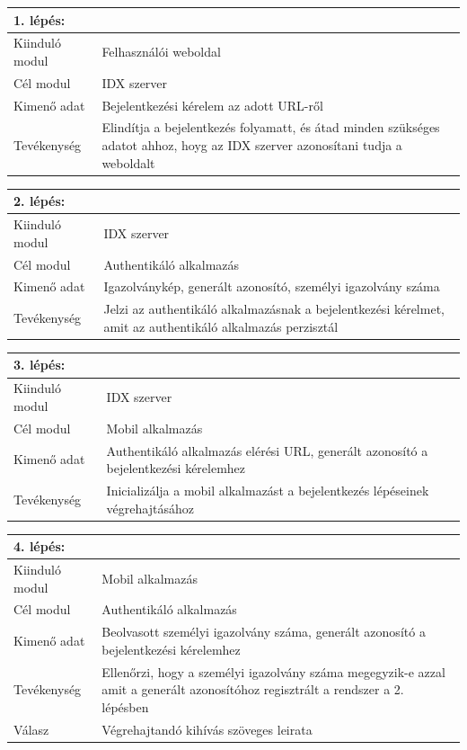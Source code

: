\begin{tabular}{|p{3cm}|p{10cm} |}
   	\hline
	\textbf{1. lépés:} & \textbf{}\\ \hline
	Kiinduló modul & Felhasználói weboldal \\ \hline
	Cél modul & IDX szerver \\ \hline
	Kimenő adat & Bejelentkezési kérelem az adott URL-ről \\ \hline
	Tevékenység & Elindítja a bejelentkezés folyamatt, és átad minden szükséges adatot ahhoz, hoyg az IDX szerver azonosítani tudja a weboldalt \\ \hline
\end{tabular}


\begin{tabular}{|p{3cm}|p{10cm} |}
   	\hline
	\textbf{2. lépés:} & \textbf{}\\ \hline
	Kiinduló modul & IDX szerver \\ \hline
	Cél modul & Authentikáló alkalmazás \\ \hline
	Kimenő adat & Igazolványkép, generált azonosító, személyi igazolvány száma \\ \hline
	Tevékenység & Jelzi az authentikáló alkalmazásnak a bejelentkezési kérelmet, amit az authentikáló alkalmazás perzisztál\\ \hline
\end{tabular}


\begin{tabular}{|p{3cm}|p{10cm} |}
   	\hline
	\textbf{3. lépés:} & \textbf{}\\ \hline
	Kiinduló modul & IDX szerver \\ \hline
	Cél modul & Mobil alkalmazás \\ \hline
	Kimenő adat & Authentikáló alkalmazás elérési URL, generált azonosító a bejelentkezési kérelemhez \\ \hline
	Tevékenység & Inicializálja a mobil alkalmazást a bejelentkezés lépéseinek végrehajtásához\\ \hline
\end{tabular}

\begin{tabular}{|p{3cm}|p{10cm} |}
   	\hline
	\textbf{4. lépés:} & \textbf{}\\ \hline
	Kiinduló modul & Mobil alkalmazás \\ \hline
	Cél modul & Authentikáló alkalmazás \\ \hline
	Kimenő adat & Beolvasott személyi igazolvány száma, generált azonosító a bejelentkezési kérelemhez \\ \hline
	Tevékenység & Ellenőrzi, hogy a személyi igazolvány száma megegyzik-e azzal amit a generált azonosítóhoz regisztrált a rendszer  a 2. lépésben\\ \hline
	Válasz & Végrehajtandó kihívás szöveges leirata\\ \hline
\end{tabular}


